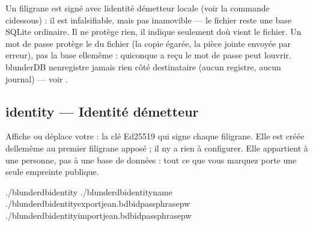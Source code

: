 \documentclass[letterpaper,10pt,dvipdfmx]{sphinxmanual}
\begin{document}
\sphinxAtStartPar
Un filigrane est signé avec l\textquotesingle{}identité d\textquotesingle{}émetteur locale (voir la commande
 ci\sphinxhyphen{}dessous) : il est infalsifiable, mais pas inamovible — le
fichier reste une base SQLite ordinaire. Il ne protège rien, il indique
seulement d\textquotesingle{}où vient le fichier. Un mot de passe protège le  du
fichier (la copie égarée, la pièce jointe envoyée par erreur), pas la base
elle\sphinxhyphen{}même : quiconque a reçu le mot de passe peut l\textquotesingle{}ouvrir. blunderDB
n\textquotesingle{}enregistre jamais rien côté destinataire (aucun registre, aucun journal) —
voir .


\subsection{identity — Identité d\textquotesingle{}émetteur}
\label{\detokenize{cli:identity-identite-d-emetteur}}
\sphinxAtStartPar
Affiche ou déplace votre  : la clé Ed25519 qui signe
chaque filigrane. Elle est créée d\textquotesingle{}elle\sphinxhyphen{}même au premier filigrane apposé ; il
n\textquotesingle{}y a rien à configurer. Elle appartient à une personne, pas à une base de
données : tout ce que vous marquez porte une seule empreinte publique.

\begin{sphinxVerbatim}[commandchars=\\\{\}]
./blunderdbidentity
./blunderdbidentity\PYGZhy{}\PYGZhy{}name
./blunderdbidentity\PYGZhy{}\PYGZhy{}exportjean.bdbid\PYGZhy{}\PYGZhy{}passphrasepw
./blunderdbidentity\PYGZhy{}\PYGZhy{}importjean.bdbid\PYGZhy{}\PYGZhy{}passphrasepw
\end{sphinxVerbatim}
\end{document}
